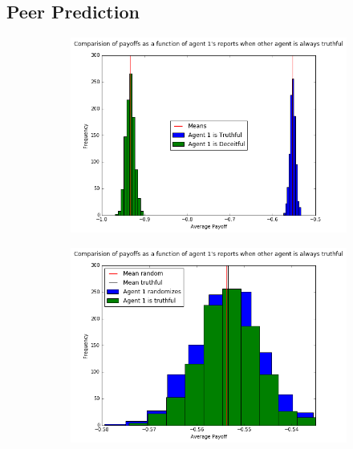 \documentclass{scrartcl}
\begin{document}
\subsection{Peer Prediction}
\begin{figure}[H]
\caption{Computational verification of Property 1}
\begin{subfigure}{0.4\textwidth}
\includegraphics[scale=0.4]{pp_1}
\end{subfigure}
\hspace{0.1\textwidth}
\begin{subfigure}{0.4\textwidth}
\includegraphics[scale=0.4]{rand}
\end{subfigure}
\end{figure}
\end{document}
